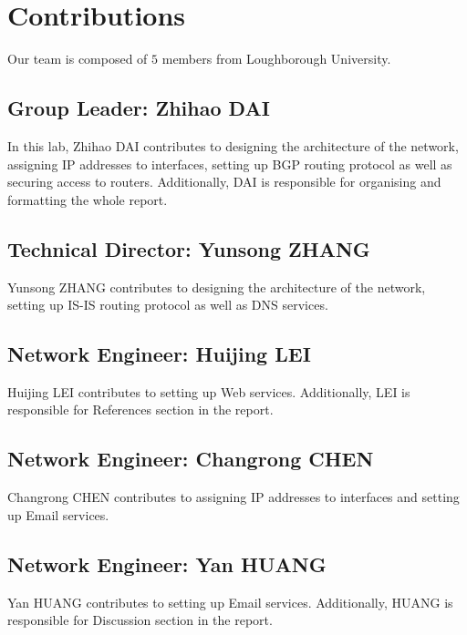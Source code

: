\chapter{Contributions}
\label{chap:contributions}

Our team is composed of $5$ members from Loughborough University.

\section{Group Leader: Zhihao DAI}
In this lab, Zhihao DAI contributes to 
designing the architecture of the network,
assigning IP addresses to interfaces,
setting up BGP routing protocol
as well as
securing access to routers.
Additionally, DAI is responsible for
organising and formatting the whole report.

\section{Technical Director: Yunsong ZHANG}
Yunsong ZHANG contributes to
designing the architecture of the network,
setting up IS-IS routing protocol
as well as
DNS services.


\section{Network Engineer: Huijing LEI}
Huijing LEI contributes to
setting up Web services.
Additionally, LEI is responsible for 
References section in the report.

\section{Network Engineer: Changrong CHEN}
Changrong CHEN contributes to
assigning IP addresses to interfaces and
setting up Email services.

\section{Network Engineer: Yan HUANG}
Yan HUANG contributes to
setting up Email services.
Additionally, HUANG is responsible for 
Discussion section in the report.






